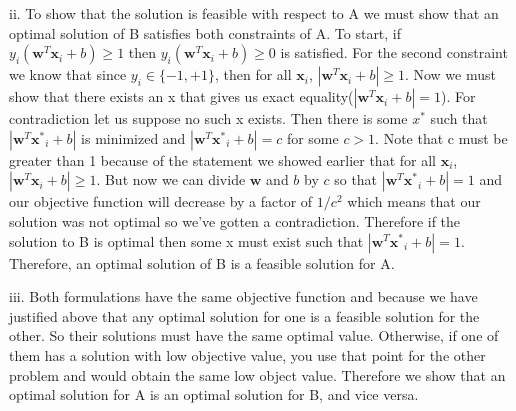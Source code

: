 \documentclass[a4paper]{article}
\begin{document}
ii. %
To show that the solution is feasible with respect to A we must show that an optimal solution of B satisfies both constraints of A. To start, if $y_{i}(\mathbf{w}^T\mathbf{x}_i+b)\geq 1$ then $y_{i}(\mathbf{w}^T\mathbf{x}_i+b)\geq 0$ is satisfied. For the second constraint we know that since $y_i \in \{-1,+1\}$, then for all $\mathbf{x}_i$, $ \left| \mathbf{w}^T \mathbf{x}_{i}+b \right | \geq 1$. Now we must show that there exists an x that gives us exact equality($ \left| \mathbf{w}^T \mathbf{x}_{i}+b \right | = 1$). For contradiction let us suppose no such x exists. Then there is some $x^*$ such that $ \left| \mathbf{w}^T \mathbf{x^*}_{i}+b \right |$ is minimized and $ \left| \mathbf{w}^T \mathbf{x^*}_{i}+b \right | = c $ for some $c > 1$. Note that c must be greater than 1 because of the statement we showed earlier that for all $\mathbf{x}_i$, $ \left| \mathbf{w}^T \mathbf{x}_{i}+b \right | \geq 1$. But now we can divide $\mathbf{w}$ and $b$ by $c$ so that $ \left| \mathbf{w}^T \mathbf{x^*}_{i}+b \right | = 1$ and our objective function will decrease by a factor of $1/c^2$ which means that our solution was not optimal so we’ve gotten a contradiction. Therefore if the solution to B is optimal then some x must exist such that $ \left| \mathbf{w}^T \mathbf{x^*}_{i}+b \right | = 1$. Therefore, an optimal solution of B is a feasible solution for A.


iii. Both formulations have the same objective function and because we have justified above that any optimal solution for one is a feasible solution for the other. So their solutions must have the same optimal value. Otherwise, if one of them has a solution with low objective value, you use that point for the other problem and would obtain the same low object value. Therefore we show that an optimal solution for A is an optimal solution for B, and vice versa.

\end{document}

